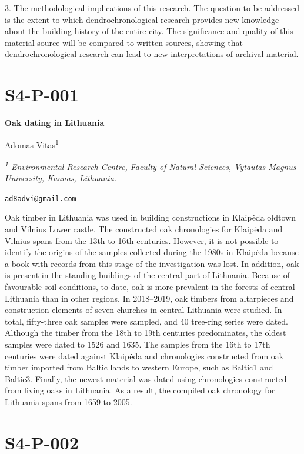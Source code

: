 \documentclass[
]{book}
\begin{document}
3. The methodological implications of this research. The question to be addressed is the extent to which dendrochronological research provides new knowledge about the building history of the entire city. The significance and quality of this material source will be compared to written sources, showing that dendrochronological research can lead to new interpretations of archival material.

\hypertarget{s4-p-001}{%
\section*{S4-P-001}\label{s4-p-001}}

\textbf{Oak dating in Lithuania}

Adomas Vitas\textsuperscript{1}

\emph{\textsuperscript{1} Environmental Research Centre, Faculty of Natural Sciences, Vytautas Magnus University, Kaunas, Lithuania.}

\href{mailto:ad8advi@gmail.com}{\nolinkurl{ad8advi@gmail.com}}

Oak timber in Lithuania was used in building constructions in Klaipėda oldtown and Vilnius Lower castle. The constructed oak chronologies for Klaipėda and Vilnius spans from the 13th to 16th centuries. However, it is not possible to identify the origins of the samples collected during the 1980s in Klaipėda because a book with records from this stage of the investigation was lost. In addition, oak is present in the standing buildings of the central part of Lithuania. Because of favourable soil conditions, to date, oak is more prevalent in the forests of central Lithuania than in other regions. In 2018--2019, oak timbers from altarpieces and construction elements of seven churches in central Lithuania were studied. In total, fifty-three oak samples were sampled, and 40 tree-ring series were dated. Although the timber from the 18th to 19th centuries predominates, the oldest samples were dated to 1526 and 1635. The samples from the 16th to 17th centuries were dated against Klaipėda and chronologies constructed from oak timber imported from Baltic lands to western Europe, such as Baltic1 and Baltic3. Finally, the newest material was dated using chronologies constructed from living oaks in Lithuania. As a result, the compiled oak chronology for Lithuania spans from 1659 to 2005.

\hypertarget{s4-p-002}{%
\section*{S4-P-002}\label{s4-p-002}}
\end{document}
